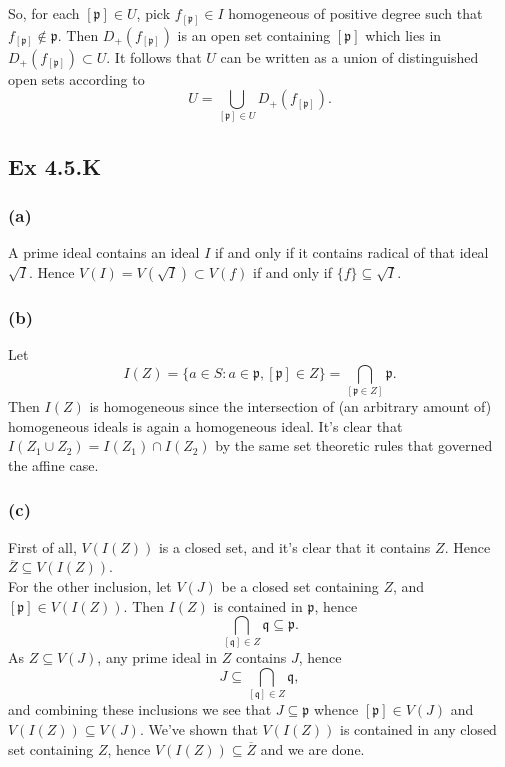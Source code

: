 \documentclass{article}
\theoremstyle{definition}
\begin{document}
So, for each $[\mathfrak{p}] \in U$, pick $f_{[\mathfrak{p}]} \in I$
homogeneous of positive degree such that $f_{[\mathfrak{p}]} \not \in
	\mathfrak{p}$. Then $D_{+}(f_{[\mathfrak{p}]})$ is an open set containing
$[\mathfrak{p}]$ which lies in $D_{+}(f_{[\mathfrak{p}]}) \subset U$. It
follows that $U$ can be written as a union of distinguished open sets according
to
\[
	U = \bigcup_{[\mathfrak{p}] \in U} D_{+}(f_{[\mathfrak{p}]}).
\]

\subsection*{Ex 4.5.K}
\subsubsection*{(a)}


A prime ideal contains an ideal $I$ if and only if it contains
radical of that ideal $\sqrt{I}$. Hence $V(I) = V(\sqrt{I}) \subset V(f)$ if
and only if $\{f\} \subseteq \sqrt{I}$.

\subsubsection*{(b)}

Let
\[
	I(Z)
	=
	\{a \in S : a \in \mathfrak{p}, [\mathfrak{p}] \in Z\}
	=
	\bigcap_{[\mathfrak{p} \in Z]} \mathfrak{p}.
\]
Then $I(Z)$ is homogeneous since the intersection of (an arbitrary amount of)
homogeneous ideals is again a homogeneous ideal. It's clear that $I(Z_1 \cup
	Z_2) = I(Z_1) \cap I(Z_2)$ by the same set theoretic rules that governed the
affine case.

\subsubsection*{(c)}

First of all, $V(I(Z))$ is a closed set, and it's clear that it contains $Z$.
Hence $\overline{Z} \subseteq V(I(Z))$. \\

For the other inclusion, let $V(J)$ be a closed set containing $Z$, and
$[\mathfrak{p}] \in V(I(Z))$. Then $I(Z)$ is contained in $\mathfrak{p}$,
hence
\[
	\bigcap_{[\mathfrak{q}] \in Z} \mathfrak{q}
	\subseteq
	\mathfrak{p}.
\]
As $Z \subseteq V(J)$, any prime ideal in $Z$ contains $J$, hence
\[
	J
	\subseteq
	\bigcap_{[\mathfrak{q}] \in Z} \mathfrak{q},
\]
and combining these inclusions we see that $J \subseteq \mathfrak{p}$ whence
$[\mathfrak{p}] \in V(J)$ and $V(I(Z)) \subseteq V(J)$. We've shown that
$V(I(Z))$ is contained in any closed set containing $Z$, hence $V(I(Z))
	\subseteq \overline{Z}$ and we are done.
\end{document}
